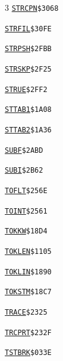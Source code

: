 \begin{multicols}{3}
\noindent\hyperlink{l:STRCPN}{\texttt{STRCPN}}\hfill\texttt{\$3068~\phantom{000}\llap{\pageref{l:STRCPN}}}\par
\noindent\hyperlink{l:STRFIL}{\texttt{STRFIL}}\hfill\texttt{\$30FE~\phantom{000}\llap{\pageref{l:STRFIL}}}\par
\noindent\hyperlink{l:STRPSH}{\texttt{STRPSH}}\hfill\texttt{\$2FBB~\phantom{000}\llap{\pageref{l:STRPSH}}}\par
\noindent\hyperlink{l:STRSKP}{\texttt{STRSKP}}\hfill\texttt{\$2F25~\phantom{000}\llap{\pageref{l:STRSKP}}}\par
\noindent\hyperlink{l:STRUE}{\texttt{STRUE}}\hfill\texttt{\$2FF2~\phantom{000}\llap{\pageref{l:STRUE}}}\par
\noindent\hyperlink{l:STTAB1}{\texttt{STTAB1}}\hfill\texttt{\$1A08~\phantom{000}\llap{\pageref{l:STTAB1}}}\par
\noindent\hyperlink{l:STTAB2}{\texttt{STTAB2}}\hfill\texttt{\$1A36~\phantom{000}\llap{\pageref{l:STTAB2}}}\par
\noindent\hyperlink{l:SUBF}{\texttt{SUBF}}\hfill\texttt{\$2ABD~\phantom{000}\llap{\pageref{l:SUBF}}}\par
\noindent\hyperlink{l:SUBI}{\texttt{SUBI}}\hfill\texttt{\$2B62~\phantom{000}\llap{\pageref{l:SUBI}}}\par
\noindent\hyperlink{l:TOFLT}{\texttt{TOFLT}}\hfill\texttt{\$256E~\phantom{000}\llap{\pageref{l:TOFLT}}}\par
\noindent\hyperlink{l:TOINT}{\texttt{TOINT}}\hfill\texttt{\$2561~\phantom{000}\llap{\pageref{l:TOINT}}}\par
\noindent\hyperlink{l:TOKKW}{\texttt{TOKKW}}\hfill\texttt{\$18D4~\phantom{000}\llap{\pageref{l:TOKKW}}}\par
\noindent\hyperlink{l:TOKLEN}{\texttt{TOKLEN}}\hfill\texttt{\$1105~\phantom{000}\llap{\pageref{l:TOKLEN}}}\par
\noindent\hyperlink{l:TOKLIN}{\texttt{TOKLIN}}\hfill\texttt{\$1890~\phantom{000}\llap{\pageref{l:TOKLIN}}}\par
\noindent\hyperlink{l:TOKSTM}{\texttt{TOKSTM}}\hfill\texttt{\$18C7~\phantom{000}\llap{\pageref{l:TOKSTM}}}\par
\noindent\hyperlink{l:TRACE}{\texttt{TRACE}}\hfill\texttt{\$2325~\phantom{000}\llap{\pageref{l:TRACE}}}\par
\noindent\hyperlink{l:TRCPRT}{\texttt{TRCPRT}}\hfill\texttt{\$232F~\phantom{000}\llap{\pageref{l:TRCPRT}}}\par
\noindent\hyperlink{l:TSTBRK}{\texttt{TSTBRK}}\hfill\texttt{\$033E~\phantom{000}\llap{\pageref{l:TSTBRK}}}\par

\end{multicols}
